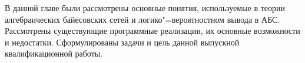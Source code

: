 В данной главе были рассмотрены основные понятия, используемые в теории алгебраических байесовских сетей и логико"=вероятностном вывода в АБС. Рассмотрены существующие программные реализации, их основные возможности и недостатки. Сформулированы задачи и цель данной выпускной квалификационной работы.
